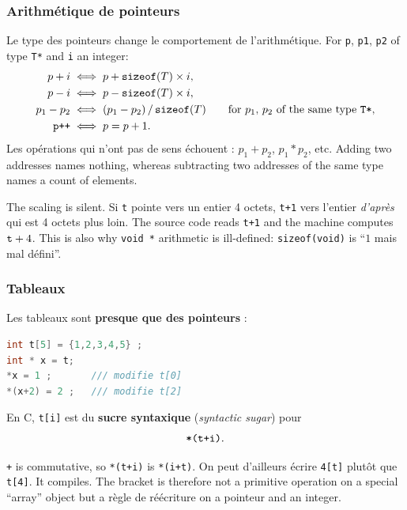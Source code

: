\subsubsection{Arithmétique de pointeurs}
Le type des pointeurs change le comportement de l'arithmétique. For
\verb|p|, \verb|p1|, \verb|p2| of type \verb|T*| and \verb|i| an integer:
\begin{align*}
  p + i &\;\Longleftrightarrow\; p + \mathtt{sizeof}(T) \times i, \\
  p - i &\;\Longleftrightarrow\; p - \mathtt{sizeof}(T) \times i, \\
  p_1 - p_2 &\;\Longleftrightarrow\; (p_1 - p_2) \,/\, \mathtt{sizeof}(T)
    \qquad \text{for } p_1,\, p_2 \text{ of the same type } \text{\texttt{T*}}, \\
  \text{\texttt{p++}} &\;\Longleftrightarrow\; p = p + 1.
\end{align*}
Les opérations qui n'ont pas de sens échouent : $p_1 + p_2$, $p_1 * p_2$,
etc. Adding two addresses names nothing, whereas subtracting two addresses of
the same type names a count of elements.

\begin{remark}
  The scaling is silent. Si \verb|t| pointe vers un entier 4 octets,
  \verb|t+1| vers l'entier \textit{d'après} qui est 4 octets plus loin. The
  source code reads \verb|t+1| and the machine computes
  $\verb|t| + 4$. This is also why \verb|void *| arithmetic is ill-defined:
  \verb|sizeof(void)| is ``$1$ mais mal défini''.
\end{remark}

\subsubsection{Tableaux}
Les tableaux sont \textbf{presque que des pointeurs} :

\begin{lstlisting}[language=C]
int t[5] = {1,2,3,4,5} ;
int * x = t;
*x = 1 ;       /// modifie t[0]
*(x+2) = 2 ;   /// modifie t[2]
\end{lstlisting}

\begin{prop}
  En C, \verb|t[i]| est du \textbf{sucre syntaxique} (\textit{syntactic sugar})
  pour
  \[ \verb|*(t+i)|. \]
\end{prop}

\begin{remark}
  \verb|+| is commutative, so \verb|*(t+i)| is \verb|*(i+t)|. On peut
  d'ailleurs écrire \verb|4[t]| plutôt que \verb|t[4]|. It compiles. The
  bracket is therefore not a primitive operation on a special ``array'' object
  but a règle de réécriture on a pointeur and an integer.
\end{remark}


